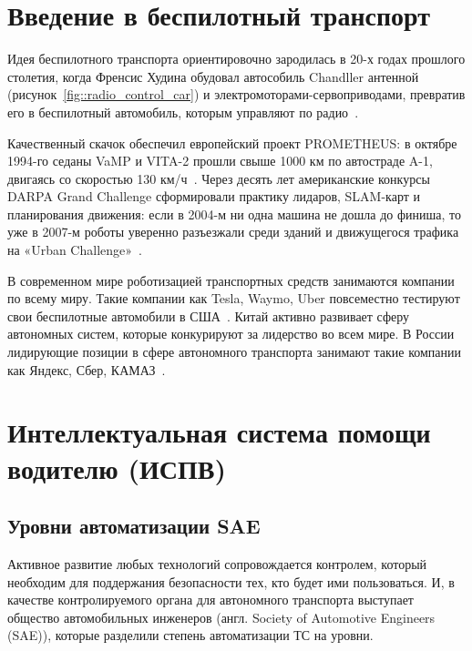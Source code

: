 \section{Введение в беспилотный транспорт}

Идея беспилотного транспорта ориентировочно зародилась в 20-х годах прошлого столетия, когда Френсис Худина обудовал автособиль Chandller антенной (рисунок~\ref{fig::radio_control_car}) и электромоторами-сервоприводами, превратив его в беспилотный автомобиль, которым управляют по радио~\cite{HoudinaRadioControl}. 


Качественный скачок обеспечил европейский проект PROMETHEUS: в октябре 1994-го седаны VaMP и VITA-2 прошли свыше 1000 км по автостраде A-1, двигаясь со скоростью 130 км/ч~\cite{VaMPWikipedia}. Через десять лет американские конкурсы DARPA Grand Challenge сформировали практику лидаров, SLAM-карт и планирования движения: если в 2004-м ни одна машина не дошла до финиша, то уже в 2007-м роботы уверенно разъезжали среди зданий и движущегося трафика на «Urban Challenge»~\cite{UrmsonWhittaker2008}. 

В современном мире роботизацией транспортных средств занимаются компании по всему миру. Такие компании как Tesla, Waymo, Uber повсеместно тестируют свои беспилотные автомобили в США~\cite{WaymoOneSF2023}. Китай активно развивает сферу автономных систем, которые конкурируют за лидерство во всем мире. В России лидирующие позиции в сфере автономного транспорта занимают такие компании как Яндекс, Сбер, КАМАЗ~\cite{Sokolov2023}.

\section{Интеллектуальная система помощи водителю (ИСПВ)}
 
\subsection{Уровни автоматизации SAE}

Активное развитие любых технологий сопровождается контролем, который необходим для поддержания безопасности тех, кто будет ими пользоваться. И, в качестве контролируемого органа для автономного транспорта выступает общество автомобильных инженеров (англ. Society of Automotive Engineers (SAE)), которые разделили степень автоматизации ТС на уровни.

